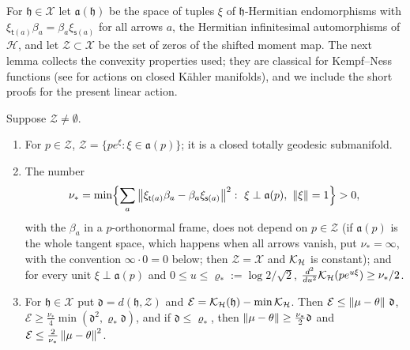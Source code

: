 For $\mathfrak h\in\mathcal X$ let $\mathfrak a(\mathfrak h)$ be the space of
tuples $\xi$ of $\mathfrak h$-Hermitian endomorphisms with
$\xi_{\mathsf t(a)}\beta_a=\beta_a\xi_{\mathsf s(a)}$ for all arrows $a$, the
Hermitian infinitesimal automorphisms of $\mathcal H$, and let
$\mathcal Z\subset\mathcal X$ be the set of zeros of the shifted moment map. The next
lemma collects the convexity properties used; they are classical for
Kempf--Ness functions (see \cite[Theorem~4.3]{grs21} for actions on closed
K\"ahler manifolds), and we include the short proofs for the present linear
action.

\begin{lemma}\label{lem:convexity}
Suppose $\mathcal Z\neq\emptyset$.
\begin{enumerate}
\item[(a)] For $p\in\mathcal Z$, $\mathcal Z=\{pe^\xi:\xi\in\mathfrak a(p)\}$;
 it is a closed totally geodesic submanifold.
\item[(b)] The number
 \[
 \nu_*=\min\Bigl\{\sum_a\left\lVert\xi_{\mathsf t(a)}\beta_a-\beta_a\xi_{\mathsf s(a)}\right\rVert^2:\
 \xi\perp\mathfrak a(p),\ \left\lVert\xi\right\rVert=1\Bigr\}>0,
 \]
 with the $\beta_a$ in a $p$-orthonormal frame, does not depend on
 $p\in\mathcal Z$ (if $\mathfrak a(p)$ is the whole tangent space, which
 happens when all arrows vanish, put $\nu_*=\infty$, with the convention
 $\infty\cdot0=0$ below; then $\mathcal Z=\mathcal X$ and
 $\mathcal K_{\mathcal H}$ is constant); and for every unit
 $\xi\perp\mathfrak a(p)$ and
 $0\leq u\leq\varrho_*:=\log2/\sqrt2$,
 $\frac{d^2}{du^2}\mathcal K_{\mathcal H}(pe^{u\xi})\geq\nu_*/2$.
\item[(c)] For $\mathfrak h\in\mathcal X$ put
 $\mathfrak d=d(\mathfrak h,\mathcal Z)$ and
 $\mathcal E=\mathcal K_{\mathcal H}(\mathfrak h)-\min\mathcal K_{\mathcal H}$. Then
 $\mathcal E\leq\left\lVert\mu-\theta\right\rVert\,\mathfrak d$,
 $\mathcal E\geq\frac{\nu_*}4\min(\mathfrak d^2,\varrho_*\mathfrak d)$,
 and if $\mathfrak d\leq\varrho_*$, then
 $\left\lVert\mu-\theta\right\rVert\geq\frac{\nu_*}2\mathfrak d$ and
 $\mathcal E\leq\frac2{\nu_*}\left\lVert\mu-\theta\right\rVert^2$.
\end{enumerate}
\end{lemma}

